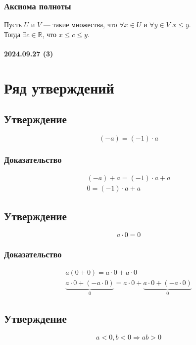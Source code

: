 \documentclass{article}
\begin{document}
\subsubsection{Аксиома полноты}
Пусть $U$ и $V$ --- такие множества, что $\forall x \in U$ и $\forall y \in V$ $x \le y$. \\
Тогда $\exists c \in \mathbb{R}$, что $x \le c \le y$. 



\paragraph{2024.09.27 (3)}
\section{Ряд утверждений}

\subsection{Утверждение}
\[
    (-a) = (-1) \cdot a
\]

\subsubsection{Доказательство}
\begin{gather*}
    (-a) + a = (-1) \cdot a + a \\
    0 = (-1) \cdot a + a
\end{gather*}


\subsection{Утверждение}
\[
    a \cdot 0 = 0
\]

\subsubsection{Доказательство}
\begin{gather*}
    a(0 + 0) = a \cdot 0 + a \cdot 0 \\
    \underbrace{a \cdot 0 + (-a \cdot 0)}_{0} = a \cdot 0 + \underbrace{a \cdot 0 + (-a \cdot 0)}_{0}
\end{gather*}


\subsection{Утверждение}
\[
    a < 0, b < 0 \Rightarrow ab > 0
\]
\end{document}
